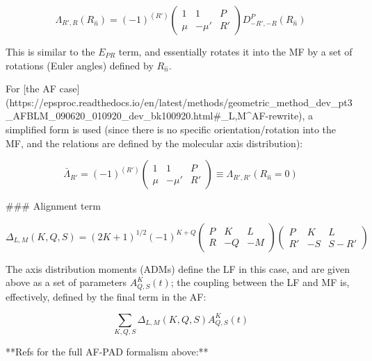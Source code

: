 \begin{equation}
\Lambda_{R',R}(R_{\hat{n}})=(-1)^{(R')}\left(\begin{array}{ccc}
1 & 1 & P\\
\mu & -\mu' & R'
\end{array}\right)D_{-R',-R}^{P}(R_{\hat{n}})
\end{equation}

This is similar to the $E_{PR}$ term, and essentially rotates it into the MF by a set of rotations (Euler angles) defined by $R_{\hat{n}}$.

For [the AF case](https://epsproc.readthedocs.io/en/latest/methods/geometric_method_dev_pt3_AFBLM_090620_010920_dev_bk100920.html#\beta_{L,M}^{AF}-rewrite), a simplified form is used (since there is no specific orientation/rotation into the MF, and the relations are defined by the molecular axis distribution):

\begin{equation}
\bar{\Lambda}_{R'}=(-1)^{(R')}\left(\begin{array}{ccc}
1 & 1 & P\\
\mu & -\mu' & R'
\end{array}\right)\equiv\Lambda_{R',R'}(R_{\hat{n}}=0)
\end{equation} 


### Alignment term

\begin{equation}
\Delta_{L,M}(K,Q,S)=(2K+1)^{1/2}(-1)^{K+Q}\left(\begin{array}{ccc}
P & K & L\\
R & -Q & -M
\end{array}\right)\left(\begin{array}{ccc}
P & K & L\\
R' & -S & S-R'
\end{array}\right)
\end{equation}

The axis distribution moments (ADMs) define the LF in this case, and are given above as a set of parameters $A_{Q,S}^{K}(t)$; the coupling between the LF and MF is, effectively, defined by the final term in the AF:

\begin{equation}
\sum_{K,Q,S}\Delta_{L,M}(K,Q,S)A_{Q,S}^{K}(t)
\end{equation}


**Refs for the full AF-PAD formalism above:**

